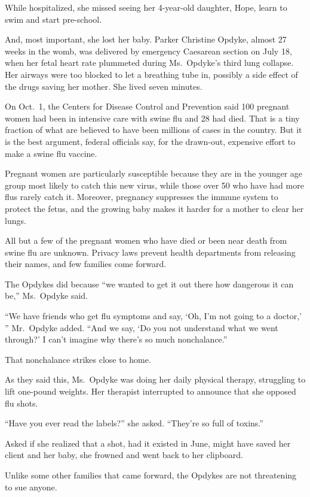 ﻿\documentclass[12pt]{article}
\begin{document}
While hospitalized, she missed seeing her 4-year-old daughter, Hope, learn to swim and start
pre-school.

And, most important, she lost her baby. Parker Christine Opdyke, almost 27 weeks in the womb, was
delivered by emergency Caesarean section on July 18, when her fetal heart rate plummeted during
Ms.~Opdyke's third lung collapse. Her airways were too blocked to let a breathing tube in, possibly
a side effect of the drugs saving her mother. She lived seven minutes.

On Oct.~1, the Centers for Disease Control and Prevention said 100 pregnant women had been in
intensive care with swine flu and 28 had died. That is a tiny fraction of what are believed to have
been millions of cases in the country. But it is the best argument, federal officials say, for the
drawn-out, expensive effort to make a swine flu vaccine.

Pregnant women are particularly susceptible because they are in the younger age group most likely to
catch this new virus, while those over 50 who have had more flus rarely catch it. Moreover,
pregnancy suppresses the immune system to protect the fetus, and the growing baby makes it harder
for a mother to clear her lungs.

All but a few of the pregnant women who have died or been near death from swine flu are unknown.
Privacy laws prevent health departments from releasing their names, and few families come forward.

The Opdykes did because ``we wanted to get it out there how dangerous it can be,'' Ms.~Opdyke said.

``We have friends who get flu symptoms and say, `Oh, I'm not going to a doctor,' '' Mr.~Opdyke
added. ``And we say, `Do you not understand what we went through?' I can't imagine why there's so
much nonchalance\cite{nonchalance}.''

That nonchalance strikes close to home.

As they said this, Ms.~Opdyke was doing her daily physical therapy, struggling to lift one-pound
weights. Her therapist interrupted to announce that she opposed flu shots.

``Have you ever read the labels?'' she asked. ``They're so full of toxins.''

Asked if she realized that a shot, had it existed in June, might have saved her client and her baby,
she frowned and went back to her clipboard.

Unlike some other families that came forward, the Opdykes are not threatening to sue anyone.
\end{document}

